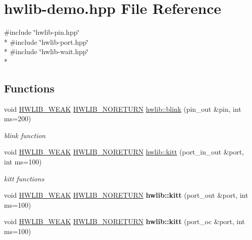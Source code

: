 \hypertarget{hwlib-demo_8hpp}{}\section{hwlib-\/demo.hpp File Reference}
\label{hwlib-demo_8hpp}
{\ttfamily \#include \char`\"{}hwlib-\/pin.\+hpp\char`\"{}}\\*
{\ttfamily \#include \char`\"{}hwlib-\/port.\+hpp\char`\"{}}\\*
{\ttfamily \#include \char`\"{}hwlib-\/wait.\+hpp\char`\"{}}\\*
\subsection*{Functions}
\begin{DoxyCompactItemize}
\item 
void \hyperlink{hwlib-defines_8hpp_a04be4340016df60d6636c1d1c6d94fc9}{H\+W\+L\+I\+B\+\_\+\+W\+E\+AK} \hyperlink{hwlib-defines_8hpp_aef311f1f416fdcbd1fa22376dcc01029}{H\+W\+L\+I\+B\+\_\+\+N\+O\+R\+E\+T\+U\+RN} \hyperlink{hwlib-demo_8hpp_a80ba9dfd5a09c9da29bcc865a5fc85ff}{hwlib\+::blink} (pin\+\_\+out \&pin, int ms=200)
\begin{DoxyCompactList}\small\item\em blink function \end{DoxyCompactList}\item 
void \hyperlink{hwlib-defines_8hpp_a04be4340016df60d6636c1d1c6d94fc9}{H\+W\+L\+I\+B\+\_\+\+W\+E\+AK} \hyperlink{hwlib-defines_8hpp_aef311f1f416fdcbd1fa22376dcc01029}{H\+W\+L\+I\+B\+\_\+\+N\+O\+R\+E\+T\+U\+RN} \hyperlink{hwlib-demo_8hpp_af01d061e28150ea14c1e9d01183792d3}{hwlib\+::kitt} (port\+\_\+in\+\_\+out \&port, int ms=100)
\begin{DoxyCompactList}\small\item\em kitt functions \end{DoxyCompactList}\item 
void \hyperlink{hwlib-defines_8hpp_a04be4340016df60d6636c1d1c6d94fc9}{H\+W\+L\+I\+B\+\_\+\+W\+E\+AK} \hyperlink{hwlib-defines_8hpp_aef311f1f416fdcbd1fa22376dcc01029}{H\+W\+L\+I\+B\+\_\+\+N\+O\+R\+E\+T\+U\+RN} {\bfseries hwlib\+::kitt} (port\+\_\+out \&port, int ms=100)\hypertarget{hwlib-demo_8hpp_afe638539acc989325624e978e3d1f329}{}\label{hwlib-demo_8hpp_afe638539acc989325624e978e3d1f329}

\item 
void \hyperlink{hwlib-defines_8hpp_a04be4340016df60d6636c1d1c6d94fc9}{H\+W\+L\+I\+B\+\_\+\+W\+E\+AK} \hyperlink{hwlib-defines_8hpp_aef311f1f416fdcbd1fa22376dcc01029}{H\+W\+L\+I\+B\+\_\+\+N\+O\+R\+E\+T\+U\+RN} {\bfseries hwlib\+::kitt} (port\+\_\+oc \&port, int ms=100)\hypertarget{hwlib-demo_8hpp_aa809d974c66cb1552aae0ae0fee7bb36}{}\label{hwlib-demo_8hpp_aa809d974c66cb1552aae0ae0fee7bb36}


\end{DoxyCompactItemize}
